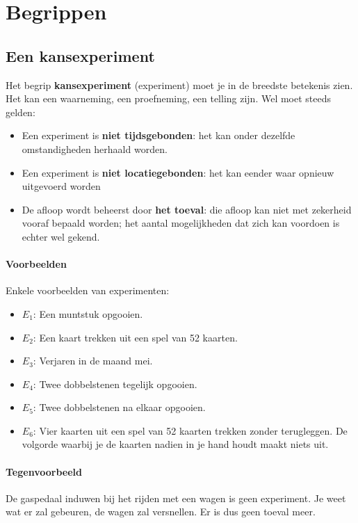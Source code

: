 \documentclass[12pt,a4paper,twoside]{article}
\begin{document}
\cleardoublepage
\section{Begrippen}

\subsection{Een kansexperiment}

Het begrip {\bf kansexperiment} (experiment) moet je in de breedste betekenis zien. Het kan een
waarneming, een proefneming, een telling zijn. Wel moet steeds gelden:
\begin{itemize}
  \item Een experiment is {\bf niet tijdsgebonden}: het kan onder dezelfde omstandigheden herhaald worden.
  \item Een experiment is {\bf niet locatiegebonden}: het kan eender waar opnieuw uitgevoerd worden
  \item De afloop wordt beheerst door {\bf het toeval}: die afloop kan niet met zekerheid vooraf bepaald worden; het aantal mogelijkheden dat zich kan voordoen is echter wel gekend.
\end{itemize}

\paragraph*{Voorbeelden} Enkele voorbeelden van experimenten:
\begin{itemize}
  \item $E_1$: Een muntstuk opgooien.
  \item $E_2$: Een kaart trekken uit een spel van 52 kaarten.
  \item $E_3$: Verjaren in de maand mei.
  \item $E_4$: Twee dobbelstenen tegelijk opgooien.
  \item $E_5$: Twee dobbelstenen na elkaar opgooien.
  \item $E_6$: Vier kaarten uit een spel van 52 kaarten trekken zonder terugleggen. De volgorde waarbij je de kaarten nadien in je hand houdt maakt niets uit.
\end{itemize}

\paragraph*{Tegenvoorbeeld}
De gaspedaal induwen bij het rijden met een wagen is geen experiment. Je weet wat er zal gebeuren, de wagen zal versnellen. Er is dus geen toeval meer.
\end{document}
